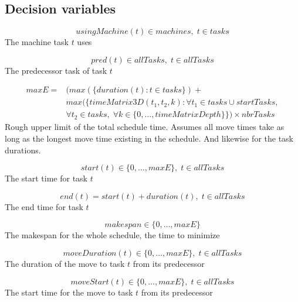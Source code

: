 \documentclass[10pt,a4paper]{report}
\begin{document}
\subsection*{Decision variables}

\begin{equation}\label{eq:40}
usingMachine(t) \in machines, \; t \in tasks\end{equation}
The machine task $t$ uses

\begin{equation}\label{eq:41}
pred(t) \in allTasks, \; t \in allTasks\end{equation}
The predecessor task of task $t$

\begin{equation}
\begin{aligned}\label{eq:45}
maxE = &(max(\{duration(t) : t \in tasks\}) +  \\ 
&max(\{timeMatrix3D(t_1,t_2,k) : \forall t_1 \in tasks \cup startTasks,  \\ 
&\forall t_2 \in tasks, \; \forall k \in \{0 , \ldots , timeMatrixDepth\}\}) \times nbrTasks
\end{aligned}
\end{equation}
Rough upper limit of the total schedule time. Assumes all move times take as long as the longest move time existing in the schedule. And likewise for the task durations.

\begin{equation}\label{eq:46}
start(t) \in \{0 , \ldots , maxE\}, \; t \in allTasks\end{equation}
The start time for task $t$

\begin{equation}\label{eq:47}
end(t) = start(t) + duration(t), \; t \in allTasks\end{equation}
The end time for task $t$

\begin{equation}\label{eq:48}
makespan \in \{0 , \ldots , maxE\}\end{equation}
The makespan for the whole schedule, the time to minimize

\begin{equation}\label{eq:49}
moveDuration(t) \in \{0 , \ldots , maxE\}, \; t \in allTasks\end{equation}
The duration of the move to task $t$ from its predecessor

\begin{equation}\label{eq:50}
moveStart(t) \in \{0 , \ldots , maxE\}, \; t \in allTasks\end{equation}
The start time for the move to task $t$ from its predecessor
\end{document}
